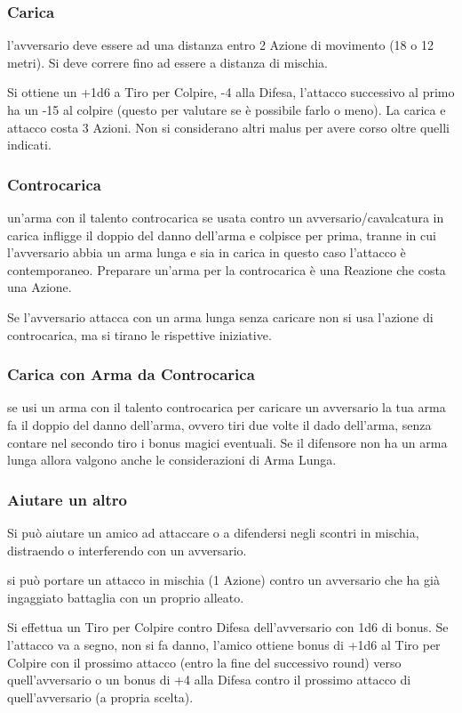 \documentclass[a4paper,11pt,twoside,openany]{book}
\begin{document}
\subsubsection{Carica} l'avversario deve essere ad una distanza entro 2 Azione di movimento (18 o 12 metri). Si deve correre fino ad essere a distanza di mischia.

Si ottiene un +1d6 a Tiro per Colpire, -4 alla Difesa, l'attacco successivo al primo ha un -15 al colpire (questo per valutare se è possibile farlo o meno). La carica e attacco costa 3 Azioni. Non si considerano altri malus per avere corso oltre quelli indicati.

\subsubsection{Controcarica} un'arma con il talento controcarica se usata contro un avversario/cavalcatura in carica infligge il doppio del danno dell'arma e colpisce per prima, tranne in cui l'avversario abbia un arma lunga e sia in carica in questo caso l'attacco è contemporaneo. Preparare un'arma per la controcarica è una Reazione che costa una Azione.

Se l'avversario attacca con un arma lunga senza caricare non si usa l'azione di controcarica, ma si tirano le rispettive iniziative.

\subsubsection{Carica con Arma da Controcarica} se usi un arma con il talento controcarica per caricare un avversario la tua arma fa il doppio del danno dell'arma, ovvero tiri due volte il dado dell'arma, senza contare nel secondo tiro i bonus magici eventuali. Se il difensore non ha un arma lunga allora valgono anche le considerazioni di Arma Lunga.

\subsubsection{Aiutare un altro} Si può aiutare un amico ad attaccare o a difendersi negli scontri in mischia, distraendo o interferendo con un avversario.

si può portare un attacco in mischia (1 Azione) contro un avversario che ha già ingaggiato battaglia con un proprio alleato.

Si effettua un Tiro per Colpire contro Difesa dell'avversario con 1d6 di bonus. Se l'attacco va a segno, non si fa danno, l'amico ottiene bonus di +1d6 al Tiro per Colpire con il prossimo attacco (entro la fine del successivo round) verso quell'avversario o un bonus di +4 alla Difesa contro il prossimo attacco di quell'avversario (a propria scelta).
\end{document}
